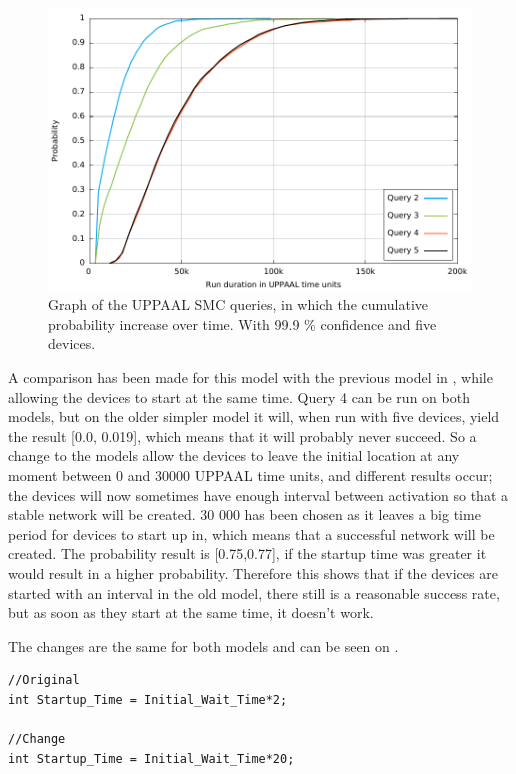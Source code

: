 \begin{figure}[ht]
  \includegraphics[width=1\textwidth]{Figures/Graphs/gnuplot/uppaal/graph.pdf} 
\caption{Graph of the UPPAAL SMC queries, in which the cumulative probability increase over time. With 99.9 \% confidence and five devices.}
\label{fig:ConnectQueryTime}
\end{figure}

\bigskip
A comparison has been made for this model with the previous model in , while allowing the devices to start at the same time.
Query 4 can be run on both models, but on the older simpler model it will, when run with five devices, yield the result [0.0, 0.019], which means that it will probably never succeed.
So a change to the models allow the devices to leave the initial location at any moment between 0 and 30000 UPPAAL time units, and different results occur; the devices will now sometimes have enough interval between activation so that a stable network will be created. 
30 000 has been chosen as it leaves a big time period for devices to start up in, which means that a successful network will be created.
The probability result is [0.75,0.77], if the startup time was greater it would result in a higher probability.
Therefore this shows that if the devices are started with an interval in the old model, there still is a reasonable success rate, but as soon as they start at the same time, it doesn't work. 

The changes are the same for both models and can be seen on . 

\begin{lstlisting}[style=UPPAAL, caption={Change in the start up time for devices.}, label={lst:startuptimeChanceListing}]
//Original
int Startup_Time = Initial_Wait_Time*2;

//Change
int Startup_Time = Initial_Wait_Time*20;
\end{lstlisting}


